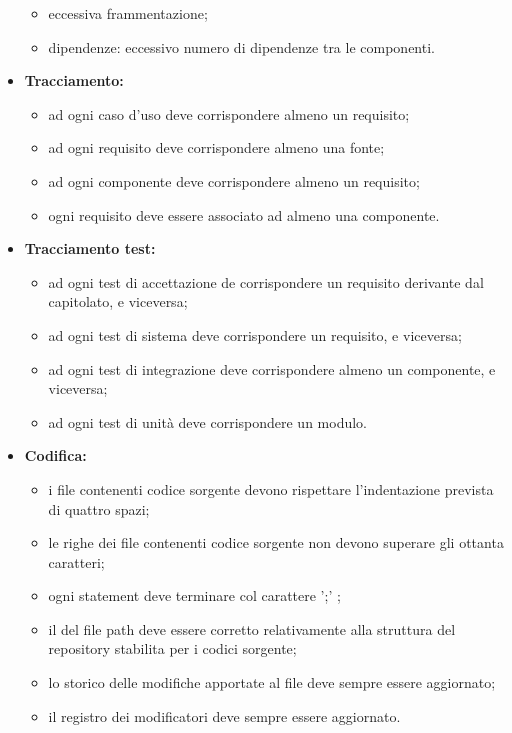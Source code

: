 \begin{itemize}
\begin{itemize}
		\item eccessiva frammentazione;
		\item dipendenze: eccessivo numero di dipendenze tra le componenti.
	\end{itemize}
	\item \textbf{Tracciamento:}
	\begin{itemize}
		\item ad ogni caso d'uso deve corrispondere almeno un requisito;
		\item ad ogni requisito deve corrispondere almeno una fonte;
		\item ad ogni componente deve corrispondere almeno un requisito;
		\item ogni requisito deve essere associato ad almeno una componente.
	\end{itemize}
	\item \textbf{Tracciamento test:}
	\begin{itemize}
		\item ad ogni test di accettazione de corrispondere un requisito derivante dal capitolato, e viceversa;
		\item ad ogni test di sistema deve corrispondere un requisito, e viceversa;
		\item ad ogni test di integrazione deve corrispondere almeno un componente, e viceversa;
		\item ad ogni test di unità deve corrispondere un modulo.
	\end{itemize}
	\item \textbf{Codifica:}
	\begin{itemize}
		\item i file contenenti codice sorgente devono rispettare l'indentazione prevista di quattro spazi;
		\item le righe dei file contenenti codice sorgente non devono superare gli ottanta caratteri;
		\item ogni statement deve terminare col carattere ';' ;
		\item il del file path deve essere corretto relativamente alla struttura del repository stabilita per i codici sorgente;
		\item lo storico delle modifiche apportate al file deve sempre essere aggiornato;
		\item il registro dei modificatori deve sempre essere aggiornato.
	\end{itemize}
\end{itemize}

